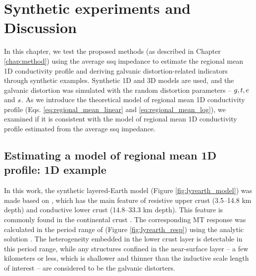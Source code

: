 \newcommand{\gtes}{(\gainp,\twistp,\shearp,\splittingp)}
\renewcommand{\thisdir}{_content/reg1d_synthetic_1d}
\renewcommand{\figdir}{\thisdir/_fig}
\chapter[Synthetic Experiments and Discussion]{Synthetic experiments and Discussion}
\label{chap:synthetic}

In this chapter, we test the proposed methods (as described in Chapter \ref{chap:method}) using the average ssq impedance to estimate the regional mean 1D conductivity profile and deriving galvanic distortion-related indicators through synthetic examples. 
%
Synthetic 1D and 3D models are used, and the galvanic distortion was simulated with the random distortion parameters -- $g, t, e$ and $s$. 
%
As we introduce the theoretical model of regional mean 1D conductivity profile (Eqs. \ref{eq:regional_mean_linear} and \ref{eq:regional_mean_log}), we examined if it is consistent with the model of regional mean 1D conductivity profile estimated from the average ssq impedance. 

\section[1D examples]{Estimating a model of regional mean 1D profile: 1D example}\label{sect:example_1d}

	In this work, the synthetic layered-Earth model (Figure \ref{fig:lyrearth_model}) was made based on \citet{jones1999a}, which has the main feature of resistive upper crust (3.5--14.8 km depth) and conductive lower crust (14.8--33.3 km depth). This feature is commonly found in the continental crust \citep{jones1999a}.
	The corresponding MT response was calculated in the period range of (Figure \ref{fig:lyrearth_resp}) using the analytic solution \citep{constable1987a}.
	The heterogeneity embedded in the lower crust layer is detectable in this period range, while any structures confined in the near-surface layer -- a few kilometers or less, which is shallower and thinner than the inductive scale length of interest -- are considered to be the galvanic distorters.

